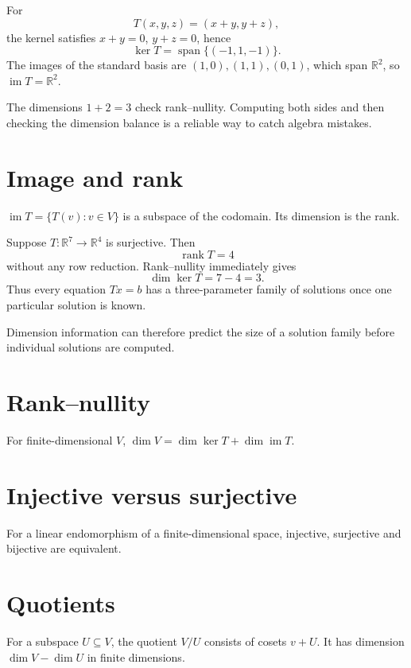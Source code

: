 \begin{example}\label{ex:i06-expand-01}
For
\[
T(x,y,z)=(x+y,y+z),
\]
the kernel satisfies \(x+y=0\), \(y+z=0\), hence
\[
\ker T=\operatorname{span}\{(-1,1,-1)\}.
\]
The images of the standard basis are
\((1,0),(1,1),(0,1)\), which span \(\mathbb R^2\), so
\(\operatorname{im}T=\mathbb R^2\).

The dimensions \(1+2=3\) check rank--nullity. Computing both sides and then
checking the dimension balance is a reliable way to catch algebra mistakes.
\end{example}
\section{Image and rank}
$\operatorname{im}T=\{T(v):v\in V\}$ is a subspace of the codomain. Its dimension is the rank.


\begin{example}\label{ex:i06-expand-02}
Suppose \(T:\mathbb R^7\to\mathbb R^4\) is surjective. Then
\[
\operatorname{rank}T=4
\]
without any row reduction. Rank--nullity immediately gives
\[
\dim\ker T=7-4=3.
\]
Thus every equation \(Tx=b\) has a three-parameter family of solutions once one
particular solution is known.

Dimension information can therefore predict the size of a solution family
before individual solutions are computed.
\end{example}
\section{Rank–nullity}
For finite-dimensional $V$, $\dim V=\dim\ker T+\dim\operatorname{im}T$.

\section{Injective versus surjective}
For a linear endomorphism of a finite-dimensional space, injective, surjective and bijective are equivalent.

\section{Quotients}
For a subspace $U\subseteq V$, the quotient $V/U$ consists of cosets $v+U$. It has dimension $\dim V-\dim U$ in finite dimensions.

